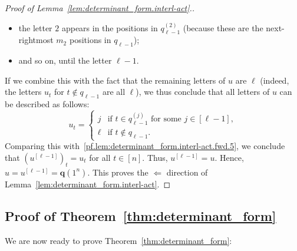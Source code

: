 \documentclass[reqno]{amsart}
\newcommand{\0}{\phantom{c}}
\newcommand{\qq}{\mathbf{q}}
\newcommand{\ive}[1]{\left[ #1 \right]}
\theoremstyle{plain}
\theoremstyle{definition}
\numberwithin{equation}{section}
\begin{document}
\begin{proof}[Proof of Lemma~\ref{lem:determinant_form.interl-act}.]
\begin{itemize}
\item the letter $2$ appears in the positions in $q_{\ell-1}^{(2)}$ (because these are the next-rightmost $m_2$ positions in $q_{\ell-1}$);
\item and so on, until the letter $\ell-1$.
\end{itemize}
If we combine this with the fact that the remaining letters of $u$ are $\ell$ (indeed, the letters $u_t$ for $t \notin q_{\ell-1}$ are all $\ell$),
we thus conclude that all letters of $u$ can be described as follows:
\[
u_t =
\begin{cases}
j & \text{if } t \in q_{\ell-1}^{(j)} \text{ for some } j \in\ive{\ell-1}\!, \\
\ell & \text{if } t \notin q_{\ell-1}.
\end{cases}
\]
Comparing this with~\eqref{pf.lem:determinant_form.interl-act.fwd.5}, we conclude that $( u^{\left[\ell-1\right]} )_t = u_t$ for all $t \in \ive{n}$.
Thus, $u^{\left[\ell-1\right]} = u$.
Hence, $u = u^{\left[\ell-1\right]} = \qq(1^n)$.
This proves the $\Longleftarrow$ direction of Lemma~\ref{lem:determinant_form.interl-act}.
\end{proof}

\subsection{Proof of Theorem~\ref{thm:determinant_form}}

We are now ready to prove Theorem~\ref{thm:determinant_form}:
\end{document}
